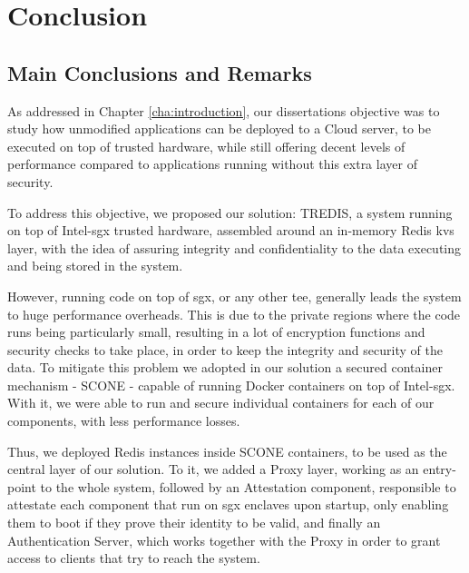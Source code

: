 \chapter{Conclusion}
\label{cha:conclusion}

\section{Main Conclusions and Remarks}

As addressed in Chapter \ref{cha:introduction}, our dissertations objective was to study how unmodified applications can be deployed to a Cloud server, to be executed on top of trusted hardware, while still offering decent levels of performance compared to applications running without this extra layer of security.

To address this objective, we proposed our solution: TREDIS, a system running on top of Intel-\gls{sgx} trusted hardware, assembled around an in-memory Redis \gls{kvs} layer, with the idea of assuring integrity and confidentiality to the data executing and being stored in the system.

However, running code on top of \gls{sgx}, or any other \gls{tee}, generally leads the system to huge performance overheads. This is due to the private regions where the code runs being particularly small, resulting in a lot of encryption functions and security checks to take place, in order to keep the integrity and security of the data. To mitigate this problem we adopted in our solution a secured container mechanism - SCONE - capable of running Docker containers on top of Intel-\gls{sgx}. With it, we were able to run and secure individual containers for each of our components, with less performance losses.

Thus, we deployed Redis instances inside SCONE containers, to be used as the central layer of our solution. To it, we added a Proxy layer, working as an entry-point to the whole system, followed by an Attestation component, responsible to attestate each component that run on \gls{sgx} enclaves upon startup, only enabling them to boot if they prove their identity to be valid, and finally an Authentication Server, which works together with the Proxy in order to grant access to clients that try to reach the system.

